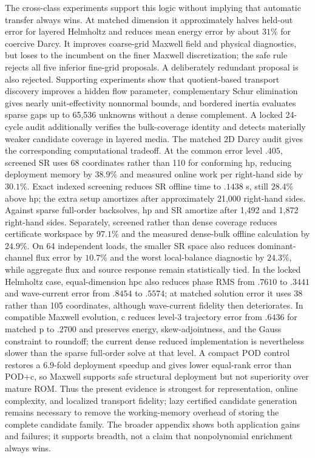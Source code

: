 \documentclass[11pt]{article}
\numberwithin{algorithm}{section}
\theoremstyle{definition}\newtheorem{definition}[theorem]{Definition}
\theoremstyle{remark}\newtheorem{remark}[theorem]{Remark}
\begin{document}
The cross-class experiments support this logic without implying that automatic
transfer always wins.  At matched dimension it approximately halves held-out
error for layered Helmholtz and reduces mean energy error by about $31\%$ for
coercive Darcy.  It improves coarse-grid Maxwell field and physical
diagnostics, but loses to the incumbent on the finer Maxwell discretization;
the safe rule rejects all five inferior fine-grid proposals.  A deliberately
redundant proposal is also rejected.  Supporting experiments show that
quotient-based transport discovery improves a hidden flow parameter,
complementary Schur elimination gives nearly unit-effectivity nonnormal bounds,
and bordered inertia evaluates sparse gaps up to 65,536 unknowns without a
dense complement.  A locked 24-cycle audit additionally verifies the
bulk-coverage identity and detects materially weaker candidate coverage in
layered media.
The matched 2D Darcy audit gives the corresponding computational tradeoff.
At the common error level $.405$, screened SR uses 68 coordinates rather than
110 for conforming hp, reducing deployment memory by $38.9\%$ and measured
online work per right-hand side by $30.1\%$.  Exact indexed screening reduces
SR offline time to $.1438$ s, still $28.4\%$ above hp; the extra setup
amortizes after approximately 21,000 right-hand sides.  Against sparse
full-order backsolves, hp and SR amortize after 1,492 and 1,872 right-hand
sides.  Separately, screened rather than dense coverage reduces certificate
workspace by $97.1\%$ and the measured dense-bulk offline calculation by
$24.9\%$.  On 64 independent loads, the smaller SR space also reduces
dominant-channel flux error by $10.7\%$ and the worst local-balance diagnostic
by $24.3\%$, while aggregate flux and source response remain statistically
tied.  In the locked Helmholtz case, equal-dimension hpc also reduces phase
RMS from $.7610$ to $.3441$ and wave-current error from $.8454$ to $.5574$;
at matched solution error it uses 38 rather than 105 coordinates, although
wave-current fidelity then deteriorates.  In compatible Maxwell evolution,
c reduces level-3 trajectory error from $.6436$ for matched p to $.2700$ and
preserves energy, skew-adjointness, and the Gauss constraint to roundoff; the
current dense reduced implementation is nevertheless slower than the sparse
full-order solve at that level.  A compact POD control restores a $6.9$-fold
deployment speedup and gives lower equal-rank error than POD+c, so Maxwell
supports safe structural deployment but not superiority over mature ROM.
Thus the present evidence is strongest for representation, online
complexity, and localized transport fidelity; lazy certified candidate
generation remains necessary to remove the working-memory overhead of storing
the complete candidate family.
The broader appendix shows both application gains and failures;
it supports breadth, not a claim that nonpolynomial enrichment always wins.
\end{document}
